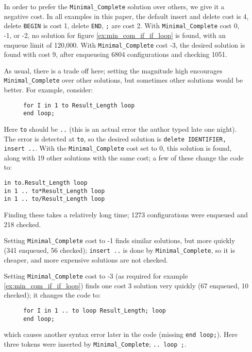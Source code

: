 \documentclass{article}
\begin{document}
In order to prefer the \verb|Minimal_Complete| solution over others,
we give it a negative cost. In all examples in this paper, the default
insert and delete cost is 4, delete \verb|BEGIN| is cost 1, delete
\verb|END|, \verb|;| are cost 2. With \verb|Minimal_Complete| cost 0,
-1, or -2, no solution for figure \ref{ex:min_com_if_if_loop} is
found, with an enqueue limit of 120,000. With \verb|Minimal_Complete|
cost -3, the desired solution is found with cost 9, after enqueueing
6804 configurations and checking 1051.

As usual, there is a trade off here; setting the magnitude high
encourages \verb|Minimal_Complete| over other solutions, but sometimes
other solutions would be better. For example, consider:
\begin{figure}[ht]
\begin{verbatim}
for I in 1 to Result_Length loop
end loop;
\end{verbatim}
\label{ex:min_com_loop_to}
\end{figure}
Here \verb|to| should be \verb|..| (this is an actual error the author
typed late one night). The error is detected at \verb|to|, so the
desired solution is \verb|delete IDENTIFIER, insert ..|. With the
\verb|Minimal_Complete| cost set to 0, this solution is found, along
with 19 other solutions with the same cost; a few of these change the
code to:

\begin{verbatim}
in to.Result_Length loop
in 1 .. to*Result_Length loop
in 1 .. to/Result_Length loop
\end{verbatim}

Finding these takes a relatively long time; 1273 configurations
were enqueued and 218 checked.

Setting \verb|Minimal_Complete| cost to -1 finds similar solutions,
but more quickly (341 enqueued, 56 checked); \verb|insert ..| is done
by \verb|Minimal_Complete|, so it is cheaper, and more expensive
solutions are not checked.

Setting \verb|Minimal_Complete| cost to -3 (as required for
example \ref{ex:min_com_if_if_loop}) finds one cost 3 solution very
quickly (67 enqueued, 10 checked); it changes the code to:
\begin{figure}[ht]
\begin{verbatim}
for I in 1 .. to loop Result_Length; loop
end loop;
\end{verbatim}
\label{ex:min_com_loop_to_3}
\end{figure}
which causes another syntax error later in the code (missing
\verb|end loop;|). Here three tokens were inserted by
\verb|Minimal_Complete|; \verb|.. loop ;|.
\end{document}

